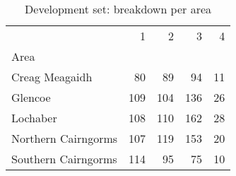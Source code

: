 \begin{table}[H]
\caption{Development set:  breakdown per area}
\label{tbl:sais_mapped_hazard_breakdown_per_area_dev}
\begin{tabular}{lrrrr}
\toprule
 & 1 & 2 & 3 & 4 \\
Area &  &  &  &  \\
\midrule
Creag Meagaidh & 80 & 89 & 94 & 11 \\
Glencoe & 109 & 104 & 136 & 26 \\
Lochaber & 108 & 110 & 162 & 28 \\
Northern Cairngorms & 107 & 119 & 153 & 20 \\
Southern Cairngorms & 114 & 95 & 75 & 10 \\
\bottomrule
\end{tabular}
\end{table}
